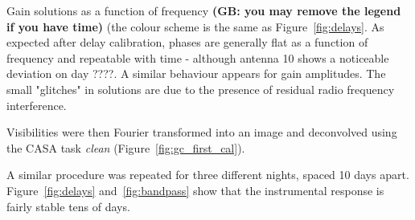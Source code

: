\documentclass[a0,portrait]{a0poster}
\begin{document}
\begin{multicols}{2}
\begin{minipage}{\columnwidth}
{    }\qquad%
    \caption{Gain solutions as a function of frequency {\bf (GB: you may remove the legend if you have time)} (the colour scheme is the same as Figure~\ref{fig:delays}. As expected after delay calibration, phases are generally flat as a function of frequency and repeatable with time - although antenna 10 shows a noticeable deviation on day ????. A similar behaviour appears for gain amplitudes. The small "glitches" in solutions are due to the presence of residual radio frequency interference.}
\label{fig:bandpass}
  \end{minipage}

Visibilities were then Fourier transformed into an image and deconvolved using the CASA task {\it clean} (Figure~\ref{fig:gc_first_cal}).

A similar procedure was repeated for three different nights, spaced 10 days apart. Figure~\ref{fig:delays} and~\ref{fig:bandpass} show that the instrumental response is fairly stable tens of days.


\end{multicols}
\end{document}
